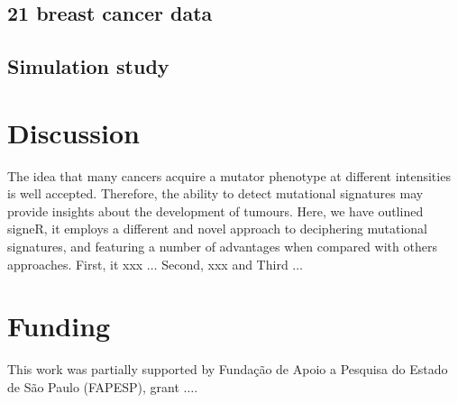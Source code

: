 \documentclass{bioinfo}
\begin{document}
\subsection{21 breast cancer data}
\subsection{Simulation study}

\section{Discussion}
The idea that many cancers acquire a mutator phenotype at different 
intensities is well accepted. Therefore, the ability to detect 
mutational signatures may provide insights about the development of
tumours. Here, we have outlined signeR, it employs a different and 
novel approach to deciphering mutational signatures, and featuring a
number of advantages when compared with others approaches. First, it
xxx $\ldots$ Second, xxx and Third $\ldots$ 

\section*{Funding}
This work was partially supported by Funda\c{c}\~ao de Apoio a
Pesquisa do Estado de S\~ao Paulo (FAPESP), grant $\ldots$. 
\vspace*{-12pt}
 
 

\end{document}
